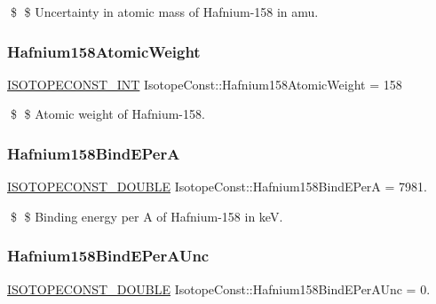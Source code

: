 \$ \$ Uncertainty in atomic mass of Hafnium-\/158 in amu. \mbox{\label{group___isotope_const-_hafnium-_hf158_ga2e7a10797df4c5039298e4a75aad019f}} 
\subsubsection{\texorpdfstring{Hafnium158\+Atomic\+Weight}{Hafnium158AtomicWeight}}
{\footnotesize\ttfamily \mbox{\hyperlink{group___isotope_const-_macros_ga5f18360b3e99483a35c32d789e62621c}{I\+S\+O\+T\+O\+P\+E\+C\+O\+N\+S\+T\+\_\+\+I\+NT}} Isotope\+Const\+::\+Hafnium158\+Atomic\+Weight = 158}

\$ \$ Atomic weight of Hafnium-\/158. \mbox{\label{group___isotope_const-_hafnium-_hf158_ga7f889bc4a7c8d419b7e62f8a225019fa}} 
\subsubsection{\texorpdfstring{Hafnium158\+Bind\+E\+PerA}{Hafnium158BindEPerA}}
{\footnotesize\ttfamily \mbox{\hyperlink{group___isotope_const-_macros_ga8f45a7272ce02c0b4c65c44636ed719a}{I\+S\+O\+T\+O\+P\+E\+C\+O\+N\+S\+T\+\_\+\+D\+O\+U\+B\+LE}} Isotope\+Const\+::\+Hafnium158\+Bind\+E\+PerA = 7981.}

\$ \$ Binding energy per A of Hafnium-\/158 in keV. \mbox{\label{group___isotope_const-_hafnium-_hf158_gac331d772811bc5dc4426eeb892d7b138}} 
\subsubsection{\texorpdfstring{Hafnium158\+Bind\+E\+Per\+A\+Unc}{Hafnium158BindEPerAUnc}}
{\footnotesize\ttfamily \mbox{\hyperlink{group___isotope_const-_macros_ga8f45a7272ce02c0b4c65c44636ed719a}{I\+S\+O\+T\+O\+P\+E\+C\+O\+N\+S\+T\+\_\+\+D\+O\+U\+B\+LE}} Isotope\+Const\+::\+Hafnium158\+Bind\+E\+Per\+A\+Unc = 0.}

